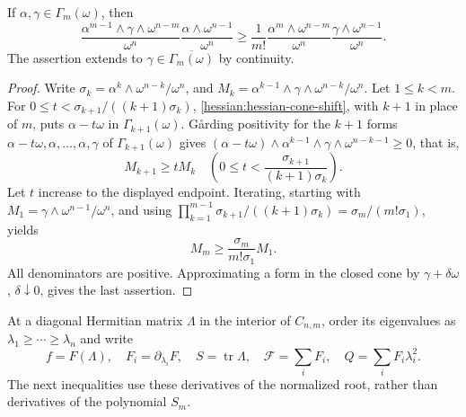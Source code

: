 \begin{lemma}\label{hessian:hessian-mixed-trace}
If $\alpha,\gamma\in\Gamma_m(\omega)$, then
\[
 \frac{\alpha^{m-1}\wedge\gamma\wedge\omega^{n-m}}{\omega^n}
 \frac{\alpha\wedge\omega^{n-1}}{\omega^n}
 \geq\frac1{m!}
 \frac{\alpha^m\wedge\omega^{n-m}}{\omega^n}
 \frac{\gamma\wedge\omega^{n-1}}{\omega^n}.
\]
The assertion extends to $\gamma\in\overline{\Gamma_m(\omega)}$ by continuity.
\end{lemma}
\begin{proof}
Write $\sigma_k=\alpha^k\wedge\omega^{n-k}/\omega^n$, and
$M_k=\alpha^{k-1}\wedge\gamma\wedge\omega^{n-k}/\omega^n$.
Let $1\leq k<m$. For $0\leq t<\sigma_{k+1}/((k+1)\sigma_k)$, \cref{hessian:hessian-cone-shift}, with $k+1$ in place of $m$, puts $\alpha-t\omega$ in $\Gamma_{k+1}(\omega)$. G\aa rding positivity for the $k+1$ forms $\alpha-t\omega,\alpha,\ldots,\alpha,\gamma$ of $\Gamma_{k+1}(\omega)$ gives $(\alpha-t\omega)\wedge\alpha^{k-1}\wedge\gamma\wedge\omega^{n-k-1}\geq0$, that is,
\[
 M_{k+1}\geq tM_k
 \quad\left(0\leq t<\frac{\sigma_{k+1}}{(k+1)\sigma_k}\right).
\]
Let $t$ increase to the displayed endpoint. Iterating, starting with $M_1=\gamma\wedge\omega^{n-1}/\omega^n$, and using $\prod_{k=1}^{m-1}\sigma_{k+1}/((k+1)\sigma_k)=\sigma_m/(m!\sigma_1)$, yields
\[
 M_m\geq\frac{\sigma_m}{m!\sigma_1}M_1.
\]
All denominators are positive. Approximating a form in the closed cone by $\gamma+\delta\omega$, $\delta\downarrow0$, gives the last assertion.
\end{proof}

At a diagonal Hermitian matrix $\Lambda$ in the interior of $C_{n,m}$, order its
eigenvalues as $\lambda_1\geq\cdots\geq\lambda_n$ and write
\[
 f=F(\Lambda),\quad F_i=\partial_{\lambda_i}F,\quad
 S=\operatorname{tr}\Lambda,\quad \mathcal F=\sum_iF_i,
 \quad Q=\sum_iF_i\lambda_i^2.
\]
The next inequalities use these derivatives of the normalized root,
rather than derivatives of the polynomial $S_m$.

